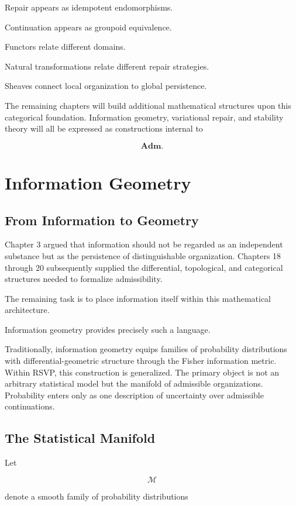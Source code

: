 \documentclass[11pt,oneside]{book}
\numberwithin{equation}{chapter}
\theoremstyle{definition}
\theoremstyle{plain}
\begin{document}
Repair appears as idempotent endomorphisms.

Continuation appears as groupoid equivalence.

Functors relate different domains.

Natural transformations relate different repair strategies.

Sheaves connect local organization to global persistence.

The remaining chapters will build additional mathematical structures upon
this categorical foundation. Information geometry, variational repair, and
stability theory will all be expressed as constructions internal to

\[
\mathbf{Adm}.
\]

\chapter{Information Geometry}

\section{From Information to Geometry}

Chapter 3 argued that information should not be regarded as an independent
substance but as the persistence of distinguishable organization. Chapters
18 through 20 subsequently supplied the differential, topological, and
categorical structures needed to formalize admissibility.

The remaining task is to place information itself within this mathematical
architecture.

Information geometry provides precisely such a language.

Traditionally, information geometry equips families of probability
distributions with differential-geometric structure through the Fisher
information metric. Within RSVP, this construction is generalized. The
primary object is not an arbitrary statistical model but the manifold of
admissible organizations. Probability enters only as one description of
uncertainty over admissible continuations.

\section{The Statistical Manifold}

Let

\[
\mathcal{M}
\]

denote a smooth family of probability distributions
\end{document}
